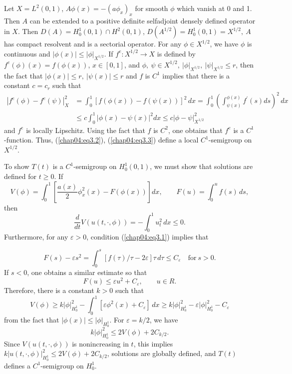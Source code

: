 \documentclass{surv-l}
\theoremstyle{plain}
\theoremstyle{definition}
\numberwithin{equation}{section}
\numberwithin{figure}{chapter}
\begin{document}
Let $X=L^{2}(0,1)$, $A\phi(x)=-(a\phi_{x})_{x}$ for smooth $\phi$ which vanish at $0$ and 1. Then $A$ can be extended to a positive definite selfadjoint densely defined operator in $X$. Then $D(A)=H_{0}^{1}(0,1)\cap H^{2}(0,1)$, $D(A^{1/2})=H_{0}^{1}(0,1) =X^{1/2},\ A$ has compact resolvent and is a sectorial operator. For any $\phi\in X^{1/2}$, we have $\phi$ is continuous and $|\phi(x)|\leq|\phi|_{X^{1/2}}$. If $f^{e}\!:X^{1/2}\rightarrow X$ is defined by $f^{e}(\phi)(x)=f(\phi(x))$, $x\in[0, 1]$, and $\phi,\ \psi\in X^{1/2},\ |\phi|_{X^{1/2}},\ |\psi|_{X^{1/2}}\leq r$, then the fact that $|\phi(x)|\leq r,\ |\psi(x)|\leq r$ and $f$ is $C^{1}$ implies that there is a constant $c=c_{r}$ such that
\begin{align*}
|f^{e}(\phi)-f^{e}(\psi)|_{X}^{2}&=\int_{0}^{1}[f(\phi(x))-f(\psi(x))]^{2}\,dx=\int_{0}^{1}\left(\int_{\psi(x)}^{\phi(x)}f^{\prime}(s)ds\right)^{2}\,dx\\
\quad&\leq c\int_{0}^{1}|\phi(x)-\psi(x)|^{2}dx\leq c|\phi-\psi|_{X^{1/2}}^{2}
\end{align*}
and $f^{e}$ is locally Lipschitz. Using the fact that $f$ is $C^{2}$, one obtains that $f^{e}$ is a $C^{1}$-function. Thus, (\ref{chap04:eq3.2}), (\ref{chap04:eq3.3}) define a local $C^{1}$-semigroup on $X^{1/2}$.

To show $T(t)$ is a $C^{1}$-semigroup on $H_{0}^{1}(0,1)$, we must show that solutions are defined for $t\geq 0$. If
\begin{equation}\label{chap04:eq3.4}
V(\phi)=\int_{0}^{1}\left[\frac{a(x)}{2}\phi_{x}^{2}(x)-F(\phi(x))\right]dx,\qquad F(u)=\int_{0}^{u}f(s)\,ds,
\end{equation}
then
\begin{equation}\label{chap04:eq3.5}
\frac{d}{dt}V(u(t, \cdot, \phi))=-\int_{0}^{1}u_{t}^{2}\,dx\leq 0.
\end{equation}
Furthermore, for any $\varepsilon>0$, condition (\ref{chap04:eq3.1}) implies that

\begin{equation*}
F(s)-\varepsilon s^{2}=\int_{0^{}}^{s}[f(\tau)/\tau-2\varepsilon]\tau\,d\tau\leq C_{\varepsilon}\quad\mathrm{for}\ s>0.
\end{equation*}
If $s<0$, one obtains a similar estimate so that
\begin{equation*}
F(u)\leq\varepsilon u^{2}+C_{\varepsilon},\qquad u\in R.
\end{equation*}
Therefore, there is a constant $k>0$ such that
\begin{equation*}
V(\phi)\geq k|\phi|_{H_{0}^{1}}^{2}-\int_{0}^{1}[\varepsilon\phi^{2}(x)+C_{\varepsilon}]\,dx\geq k|\phi|_{H_{0}^{1}}^{2}-\varepsilon|\phi|_{H_{0}^{1}}^{2}-C_{\varepsilon}
\end{equation*}
from the fact that $|\phi(x)|\leq|\phi|_{H_{0}^{1}}$. For $\varepsilon =k/2$, we have
\begin{equation*}
k|\phi|_{H_{0}^{1}}^{2}\leq 2V(\phi)+2C_{k/2}.
\end{equation*}
Since $V(u(t, \cdot, \phi))$ is nonincreasing in $t$, this implies $k|u(t, \cdot, \phi)|_{H_{0}^{1}}^{2}\leq 2V(\phi)+ 2C_{k/2}$, solutions are globally defined, and $T(t)$ defines a $C^{1}$-semigroup on $H_{0}^{1}$.
\end{document}
